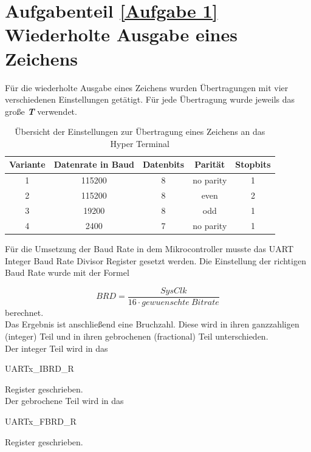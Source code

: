 \newpage

	\section{Aufgabenteil \ref{Aufgabe 1} Wiederholte Ausgabe eines Zeichens}\label{Aufgabenteil1}
	
	Für die wiederholte Ausgabe eines Zeichens wurden Übertragungen mit vier verschiedenen Einstellungen getätigt. Für jede Übertragung wurde jeweils das große \textbf{\textit{T}} verwendet.
	
	\begin{table}[h]
		\label{tab:EinstellungenZeichenübertragung}
		\centering
		\caption{Übersicht der Einstellungen zur Übertragung eines Zeichens an das Hyper Terminal}
		\begin{tabular}{|c|c|c|c|c|}
		Variante	&	Datenrate in Baud&	Datenbits&	Parität\footnotemark & Stopbits \\
				\toprule
				\bottomrule
		1	&		115200			&		 	8&	no parity	 		& 1\\
		2	&		115200 			& 			8&	even  				& 2\\
		3	&		19200			&			8&	odd					& 1\\
		4	&		2400			&			7&	no parity			& 1\\
				\hline
		\end{tabular}
	\end{table}
	 
		Für die Umsetzung der Baud Rate in dem Mikrocontroller musste das UART Integer Baud Rate Divisor Register gesetzt werden. Die Einstellung der richtigen Baud Rate wurde mit der Formel
		
		\begin{equation}
			BRD = \frac{SysClk}{16 \cdot gewuenschte~Bitrate} 
		\end{equation}\cite{Skript_Riemschneider}
		berechnet.\\
		Das Ergebnis ist anschließend eine Bruchzahl. Diese wird in ihren ganzzahligen (integer) Teil und in ihren gebrochenen (fractional) Teil unterschieden.\\
		Der integer Teil wird in das 
		\begin{center}
			UARTx\_IBRD\_R \cite{Datenblatt_TM4C1294}
		\end{center}
		Register geschrieben.\\
	
		Der gebrochene Teil wird in das 
				\begin{center}
			UARTx\_FBRD\_R \cite{Datenblatt_TM4C1294}
		\end{center}
		Register geschrieben.

